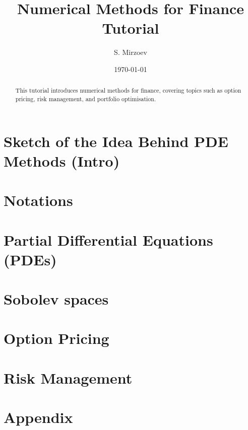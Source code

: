 \documentclass{article}
\title{Numerical Methods for Finance Tutorial}
\author{S. Mirzoev}
\date{\today}
\begin{document}
\maketitle

\begin{abstract}
This tutorial introduces numerical methods for finance, covering topics such as option pricing, risk management, and portfolio optimisation.
\end{abstract}

\section{Sketch of the Idea Behind PDE Methods (Intro)}


\section{Notations}


\section{Partial Differential Equations (PDEs)}


\section{Sobolev spaces}


\section{Option Pricing}
% 

\section{Risk Management}
% 


\section{Appendix}

\end{document}
